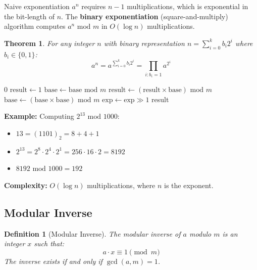 \documentclass[11pt,a4paper]{article}
\newtheorem{definition}{Definition}
\newtheorem{theorem}{Theorem}
\newcommand{\bmod}{\text{ mod }}
\begin{document}
Naive exponentiation $a^n$ requires $n-1$ multiplications, which is exponential in the bit-length of $n$. The \textbf{binary exponentiation} (square-and-multiply) algorithm computes $a^n \bmod m$ in $O(\log n)$ multiplications.

\begin{theorem}
For any integer $n$ with binary representation $n = \sum_{i=0}^{k} b_i 2^i$ where $b_i \in \{0,1\}$:
\[
a^n = a^{\sum_{i=0}^{k} b_i 2^i} = \prod_{i: b_i = 1} a^{2^i}
\]
\end{theorem}

\begin{algorithm}[H]
\caption{Binary Exponentiation (Square-and-Multiply)}
\begin{algorithmic}[1]
        \State \Return $0$
    \EndIf
    \State $\text{result} \gets 1$
    \State $\text{base} \gets \text{base} \bmod m$
         
            \State $\text{result} \gets (\text{result} \times \text{base}) \bmod m$
        \EndIf
        \State $\text{base} \gets (\text{base} \times \text{base}) \bmod m$ 
        \State $\text{exp} \gets \text{exp} \gg 1$ 
    \EndWhile
    \State \Return result
\EndFunction
\end{algorithmic}
\end{algorithm}

\textbf{Example:} Computing $2^{13} \bmod 1000$:
\begin{itemize}
    \item $13 = (1101)_2 = 8 + 4 + 1$
    \item $2^{13} = 2^8 \cdot 2^4 \cdot 2^1 = 256 \cdot 16 \cdot 2 = 8192$
    \item $8192 \bmod 1000 = 192$
\end{itemize}

\textbf{Complexity:} $O(\log n)$ multiplications, where $n$ is the exponent.

\subsection{Modular Inverse}

\begin{definition}[Modular Inverse]
The modular inverse of $a$ modulo $m$ is an integer $x$ such that:
\[
a \cdot x \equiv 1 \pmod{m}
\]
The inverse exists if and only if $\gcd(a, m) = 1$.
\end{definition}
\end{document}
